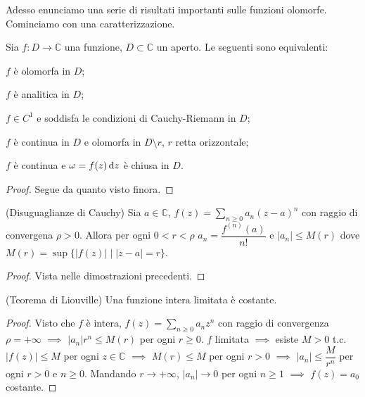 Adesso enunciamo una serie di risultati importanti sulle funzioni olomorfe. Cominciamo con una caratterizzazione.

\begin{thm}
  Sia $f:D \longrightarrow \mathbb{C}$ una funzione, $D \subset \mathbb{C}$ un aperto. Le seguenti sono equivalenti:
  \begin{nlist}
    \item $f$ è olomorfa in $D$;
    \item $f$ è analitica in $D$;
    \item $f \in C^1$ e soddisfa le condizioni di Cauchy-Riemann in $D$;
    \item $f$ è continua in $D$ e olomorfa in $D\setminus r$, $r$ retta orizzontale;
    \item $f$ è continua e $\omega=f(z)\mathop{}\!\mathrm{d} z$ è chiusa in $D$.
  \end{nlist}
\end{thm}

\begin{proof}
  Segue da quanto visto finora.
\end{proof}

\begin{cor}
  (Disuguaglianze di Cauchy) Sia $a \in \mathbb{C}$, $\displaystyle f(z)=\sum_{n \ge 0} a_n(z-a)^n$ con raggio di convergena $\rho>0$. Allora per ogni $0 <r<\rho$ $a_n=\dfrac{f^{(n)}(a)}{n!}$ e $|a_n| \le M(r)$ dove $M(r)=\sup\{|f(z)| \mid |z-a|=r\}$.
\end{cor}

\begin{proof}
  Vista nelle dimostrazioni precedenti.
\end{proof}

\begin{thm}
  (Teorema di Liouville) Una funzione intera limitata è costante.
\end{thm}

\begin{proof}
  Visto che $f$ è intera, $\displaystyle f(z)=\sum_{n \ge 0} a_nz^n$ con raggio di convergenza $\rho=+\infty$ $\implies$ $|a_n|r^n \le M(r)$ per ogni $r \ge 0$.
  $f$ limitata $\implies$ esiste $M>0$ t.c. $|f(z)| \le M$ per ogni $z \in \mathbb{C}$ $\implies$ $M(r) \le M$ per ogni $r>0$ $\implies$ $|a_n| \le \dfrac{M}{r^n}$ per ogni $r>0$ e $n \ge 0$.
  Mandando $r \longrightarrow +\infty$, $|a_n| \longrightarrow 0$ per ogni $n \ge 1$ $\implies$ $f(z)=a_0$ costante.
\end{proof}

